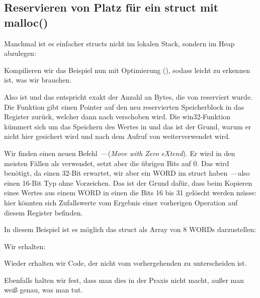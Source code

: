 \subsection{Reservieren von Platz für ein struct mit malloc()}
\label{struct_malloc_example}
Manchmal ist es einfacher structs nicht im lokalen Stack, sondern im Heap abzulegen:


Kompilieren wir das Beispiel nun mit Optimierung (\Ox), sodass leicht zu erkennen ist, was wir brauchen.



Also ist  und das entspricht exakt der Anzahl an Bytes, die von  reserviert
wurde. Die Funktion gibt einen Pointer auf den neu reservierten Speicherblock in das Register \EAX zurück, welcher dann
nach \ESI verschoben wird.
Die win32-Funktion  kümmert sich um das Speichern des Wertes in \ESI und das ist der Grund, warum er
nicht hier gesichert wird und nach dem Aufruf von  weiterverwendet wird.

Wir finden einen neuen Befehl~---\MOVZX (\emph{Move with Zero eXtend}).
Er wird in den meisten Fällen als \MOVSX verwendet, setzt aber die übrigen Bits auf 0.
Das wird benötigt, da \printf einen 32-Bit \Tint erwartet, wir aber ein WORD im struct haben~---also einen 16-Bit Typ
ohne Vorzeichen.
Das ist der Grund dafür, dass beim Kopieren eines Wertes aus einem WORD in einen \Tint die Bits 16 bis 31 gelöscht
werden müsse: hier könnten sich Zufallswerte vom Ergebnis einer vorherigen Operation auf diesem Register befinden.

In diesem Beispiel ist es möglich das struct als Array von 8 WORDs darzustellen:



Wir erhalten:


Wieder erhalten wir Code, der nicht vom vorhergehenden zu unterscheiden ist.

Ebenfalls halten wir fest, dass man dies in der Praxis nicht macht, außer man weiß genau, was man tut.


